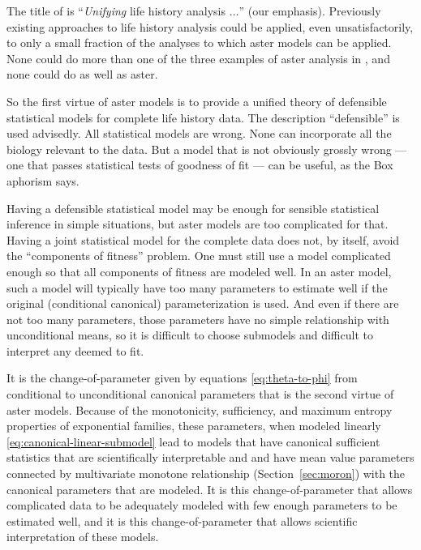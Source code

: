 \documentclass[11pt]{article}
\begin{document}
The title of \citet{aster2} is ``\emph{Unifying} life history analysis
$\ldots$'' (our emphasis).  Previously existing approaches to
life history analysis could be applied, even unsatisfactorily, to only
a small fraction of the analyses to which aster models can be applied.
None could do more than one of the three examples
of aster analysis in \citet{aster2}, and none could do as well as aster.

So the first virtue of aster models is to provide a unified theory of
defensible statistical models for complete life history data.
The description ``defensible'' is
used advisedly.  All statistical models are wrong.  None can incorporate
all the biology relevant to the data.  But a model that is not obviously
grossly wrong --- one that passes statistical tests of goodness of fit ---
can be useful, as the Box aphorism says.

Having a defensible statistical model may be enough for sensible statistical
inference in simple situations, but aster models are too complicated for that.
Having a joint statistical model for the complete data does not, by itself,
avoid the ``components of fitness'' problem.  One must still use a model
complicated enough so that all components of fitness are modeled well.
In an aster model, such a model will typically have too many parameters to
estimate well if the original (conditional canonical) parameterization is used.
And even if there are not too many parameters, those parameters have no
simple relationship with unconditional means, so it is difficult to choose
submodels and difficult to interpret any deemed to fit.

It is the change-of-parameter given by equations \eqref{eq:theta-to-phi}
from conditional to unconditional canonical parameters that is the second
virtue of aster models.  Because of the monotonicity, sufficiency, and maximum
entropy properties of exponential families, these parameters, when modeled
linearly \eqref{eq:canonical-linear-submodel} lead to models that have
canonical sufficient statistics that are scientifically interpretable and
and have mean value parameters connected by multivariate monotone relationship
(Section~\ref{sec:moron}) with the canonical parameters that are modeled.
It is this change-of-parameter that allows complicated data to be adequately
modeled with few enough parameters to be estimated well, and it is this
change-of-parameter that allows scientific interpretation of these models.
\end{document}
